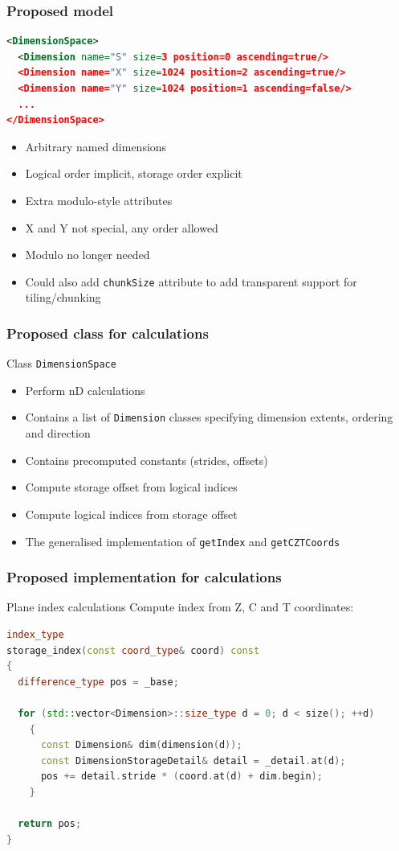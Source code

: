 \documentclass{beamer}
\begin{document}
\begin{frame}[fragile]
  \frametitle{Proposed model}
  \begin{lstlisting}[language=XML]
<DimensionSpace>
  <Dimension name="S" size=3 position=0 ascending=true/>
  <Dimension name="X" size=1024 position=2 ascending=true/> 
  <Dimension name="Y" size=1024 position=1 ascending=false/>
  ...
</DimensionSpace>
  \end{lstlisting}

  \begin{itemize}
  \item Arbitrary named dimensions
  \item Logical order implicit, storage order explicit
  \item Extra modulo-style attributes
  \item X and Y not special, any order allowed
  \item Modulo no longer needed
  \item Could also add \texttt{chunkSize} attribute to add transparent
    support for tiling/chunking
  \end{itemize}
\end{frame}

\begin{frame}
  \frametitle{Proposed class for calculations}

  \begin{block}{Class \texttt{DimensionSpace}}
    \begin{itemize}
    \item Perform nD calculations
    \item Contains a list of \texttt{Dimension} classes specifying
      dimension extents, ordering and direction
    \item Contains precomputed constants (strides, offsets)
    \item Compute storage offset from logical indices
    \item Compute logical indices from storage offset
    \item The generalised implementation of \texttt{getIndex} and
      \texttt{getCZTCoords}
    \end{itemize}
  \end{block}
\end{frame}

\begin{frame}[fragile]
  \frametitle{Proposed implementation for calculations}
  \begin{block}{Plane index calculations}
    Compute index from Z, C and T coordinates:
  \begin{lstlisting}[language=C++]
index_type
storage_index(const coord_type& coord) const
{
  difference_type pos = _base;

  for (std::vector<Dimension>::size_type d = 0; d < size(); ++d)
    {
      const Dimension& dim(dimension(d));
      const DimensionStorageDetail& detail = _detail.at(d);
      pos += detail.stride * (coord.at(d) + dim.begin);
    }

  return pos;
}
  \end{lstlisting}
  \end{block}
\end{frame}
\end{document}
